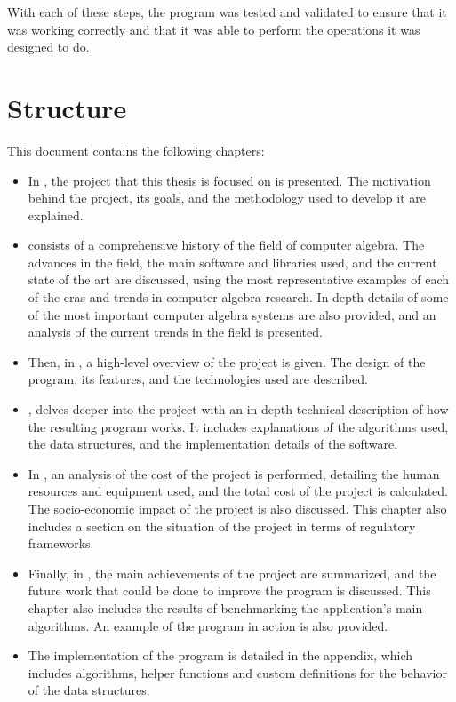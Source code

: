 With each of these steps, the program was tested and validated to ensure that it was working correctly and that it was able to perform the operations it was designed to do.

\section{Structure}\label{sec:structure}
This document contains the following chapters:
\begin{itemize}
  \item In , the project that this thesis is focused on is presented. The motivation behind the project, its goals, and the methodology used to develop it are explained.
  \item {} consists of a comprehensive history of the field of computer algebra. The advances in the field, the main software and libraries used, and the current state of the art are discussed, using the most representative examples of each of the eras and trends in computer algebra research. In-depth details of some of the most important computer algebra systems are also provided, and an analysis of the current trends in the field is presented.
  \item Then, in , a high-level overview of the project is given. The design of the program, its features, and the technologies used are described.
  \item {}, delves deeper into the project with an in-depth technical description of how the resulting program works. It includes explanations of the algorithms used, the data structures, and the implementation details of the software.
  \item In , an analysis of the cost of the project is performed, detailing the human resources and equipment used, and the total cost of the project is calculated. The socio-economic impact of the project is also discussed. This chapter also includes a section on the situation of the project in terms of regulatory frameworks.
  \item Finally, in , the main achievements of the project are summarized, and the future work that could be done to improve the program is discussed. This chapter also includes the results of benchmarking the application's main algorithms. An example of the program in action is also provided.
  \item The implementation of the program is detailed in the appendix, which includes algorithms, helper functions and custom definitions for the behavior of the data structures.
\end{itemize}
